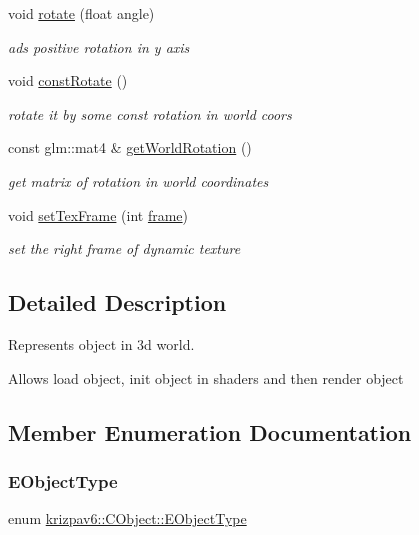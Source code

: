 \begin{DoxyCompactItemize}
void \mbox{\hyperlink{classkrizpav6_1_1_c_object_a5ba3a425e887270b8ae5febac7d18c18}{rotate}} (float angle)
\begin{DoxyCompactList}\small\item\em ads positive rotation in y axis \end{DoxyCompactList}\item 
void \mbox{\hyperlink{classkrizpav6_1_1_c_object_a11da6dc7d2bcbd967ea2cd1cd02a06cc}{const\+Rotate}} ()
\begin{DoxyCompactList}\small\item\em rotate it by some const rotation in world coors \end{DoxyCompactList}\item 
const glm\+::mat4 \& \mbox{\hyperlink{classkrizpav6_1_1_c_object_ab78fee9210bfd1f0fc68e3d0dbba44df}{get\+World\+Rotation}} ()
\begin{DoxyCompactList}\small\item\em get matrix of rotation in world coordinates \end{DoxyCompactList}\item 
void \mbox{\hyperlink{classkrizpav6_1_1_c_object_af996825ef7e813590e811856aa6fccd3}{set\+Tex\+Frame}} (int \mbox{\hyperlink{namespacekrizpav6_a5f6efd918fbcd4a4055d6015bf9d4450}{frame}})
\begin{DoxyCompactList}\small\item\em set the right frame of dynamic texture \end{DoxyCompactList}\end{DoxyCompactItemize}


\subsection{Detailed Description}
Represents object in 3d world. 

Allows load object, init object in shaders and then render object 

\subsection{Member Enumeration Documentation}
\mbox{\label{classkrizpav6_1_1_c_object_a54fa6c9a881bd5b3e1b4bc606444997f}} 
\subsubsection{\texorpdfstring{EObjectType}{EObjectType}}
{\footnotesize\ttfamily enum \mbox{\hyperlink{classkrizpav6_1_1_c_object_a54fa6c9a881bd5b3e1b4bc606444997f}{krizpav6\+::\+C\+Object\+::\+E\+Object\+Type}}}


